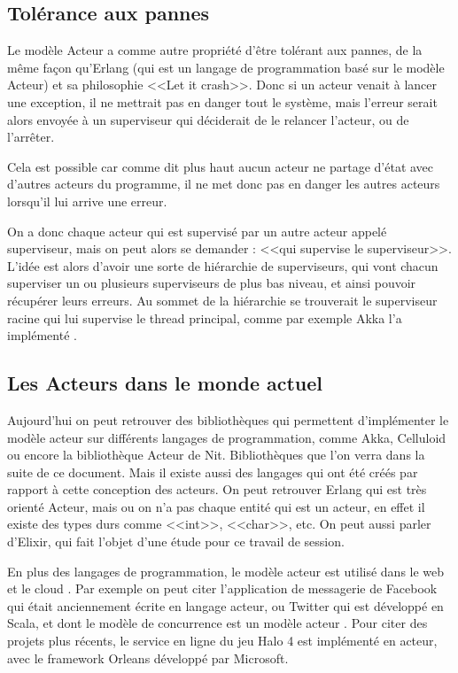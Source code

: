 \documentclass[11pt, a4paper]{article}
\begin{document}
\subsection{Tolérance aux pannes}
Le modèle Acteur a comme autre propriété d'être tolérant aux pannes, de la même façon qu'Erlang (qui est un langage de programmation basé sur le modèle Acteur) et sa philosophie <<Let it crash>>. Donc si un acteur venait à lancer une exception, il ne mettrait pas en danger tout le système, mais l'erreur serait alors envoyée à un superviseur qui déciderait de le relancer l'acteur, ou de l’arrêter.
\par Cela est possible car comme dit plus haut aucun acteur ne partage d'état avec d'autres acteurs du programme, il ne met donc pas en danger les autres acteurs lorsqu'il lui arrive une erreur.
\par On a donc chaque acteur qui est supervisé par un autre acteur appelé superviseur, mais on peut alors se demander : <<qui supervise le superviseur>>. L'idée est alors d'avoir une sorte de hiérarchie de superviseurs, qui vont chacun superviser un ou plusieurs superviseurs de plus bas niveau, et ainsi pouvoir récupérer leurs erreurs. Au sommet de la hiérarchie se trouverait le superviseur racine qui lui supervise le thread principal, comme par exemple Akka l'a implémenté \cite{akka}.

\subsection{Les Acteurs dans le monde actuel}
Aujourd'hui on peut retrouver des bibliothèques qui permettent d'implémenter le modèle acteur sur différents langages de programmation, comme Akka, Celluloid ou encore la bibliothèque Acteur de Nit. Bibliothèques que l'on verra dans la suite de ce document. Mais il existe aussi des langages qui ont été créés par rapport à cette conception des acteurs. On peut retrouver Erlang qui est très orienté Acteur, mais ou on n'a pas chaque entité qui est un acteur, en effet il existe des types durs comme <<int>>, <<char>>, etc. On peut aussi parler d’Elixir, qui fait l'objet d'une étude pour ce travail de session.
\par En plus des langages de programmation, le modèle acteur est utilisé dans le web et le cloud \cite{agha2014actors,vecchiola2009high}. Par exemple on peut citer l'application de messagerie de Facebook qui était anciennement écrite en langage acteur, ou Twitter qui est développé en Scala, et dont le modèle de concurrence est un modèle acteur \cite{twitter_concurency}. Pour citer des projets plus récents, le service en ligne du jeu Halo 4 est implémenté en acteur, avec le framework Orleans développé par Microsoft.
\end{document}
